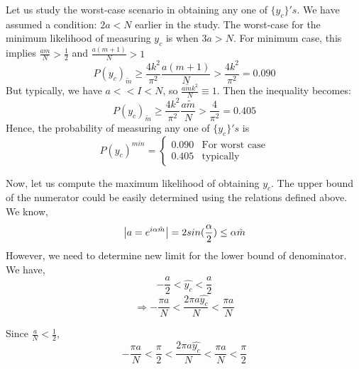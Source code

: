 Let us study the worst-case scenario in obtaining any one of $\{y_c\}'s$. We have assumed a condition: $2a<N$ earlier in the study. The worst-case for the minimum likelihood of measuring $y_c$ is when $3a>N$. For minimum case, this implies $\frac{am}{N}>\frac{1}{2}$ and $\frac{a(m+1)}{N}>1$
\begin{equation*}
    P(y_c)_{\tilde{m}} \geq \frac{4 k^2}{\pi^2 }\frac{a(m+1)}{N}>\frac{4 k^2}{\pi^2}= 0.090
\end{equation*}
But typically, we have $a<<I<N$, so $\frac{a\tilde{m}k^2}{N} \equiv 1$. Then the inequality becomes:
\begin{equation*}
    P(y_c)_{\tilde{m}} \geq \frac{4 k^2}{\pi^2 }\frac{a\tilde{m}}{N}>\frac{4}{\pi^2}=0.405 
\end{equation*}
Hence, the probability of measuring any one of $\{y_c\}'s$ is 
\begin{equation*}
P(y_c)^{min}=
    \begin{cases}
        0.090 &\text{For worst case}\\
        0.405 &\text{typically}
    \end{cases}
\end{equation*}

Now, let us compute the maximum likelihood of obtaining $y_c$.
The upper bound of the numerator could be easily determined using the relations defined above.
We know, $$\abs{a=e^{i\alpha \tilde{m}}} = 2sin(\frac{\alpha}{2}) \leq \alpha \tilde{m} $$
However, we need to determine new limit for the lower bound of denominator. We have, 
$$-\frac{a}{2} < \hat{y_c} < \frac{a}{2}$$
$$\Rightarrow -\frac{\pi a}{N} < \frac{2\pi a \hat{y_c}}{N} < \frac{\pi a}{N} $$
        
Since $\frac{a}{N} < \frac{1}{2}$,  $$-\frac{\pi a}{N} < \frac{\pi}{2}< \frac{2\pi a \hat{y_c}}{N} < \frac{\pi a}{N} < \frac{\pi}{2}$$
        

